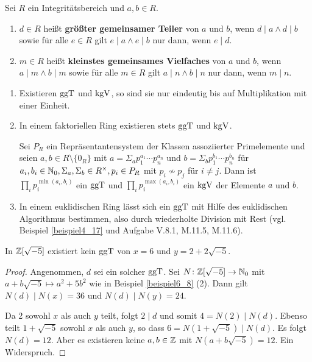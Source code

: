 \begin{definition}\label{definition6_15}
	Sei $R$ ein Integritätsbereich und $a,b \in R$.
	\begin{enumerate}[label=(\alph*)]
		\item $d \in R$ heißt \textbf{größter gemeinsamer Teiler} von $a$ und $b$, wenn $d \mid a \land d \mid b$ sowie für alle $e \in R$ gilt $e \mid a \land e \mid b$ nur dann, wenn $e \mid d$.
		\item $m \in R$ heißt  \textbf{kleinstes gemeinsames Vielfaches} von $a$ und $b$, wenn $a \mid m \land b \mid m$ sowie für alle $m \in R$ gilt $a \mid n \land b \mid n$ nur dann, wenn $m \mid n$.
	\end{enumerate}
\end{definition}
\begin{rem}\label{rem6_16}
	\begin{enumerate}[label=(\roman*)]
		\item Existieren $\mathrm{ggT}$ und $\mathrm{kgV}$, so sind sie nur eindeutig bis auf Multiplikation mit einer Einheit.
		\item In einem faktoriellen Ring existieren stets $\mathrm{ggT}$ und $\mathrm{kgV}$. 
		
		Sei $P_R$ ein Repräsentantensystem der Klassen assoziierter Primelemente und seien $a,b \in R\setminus\{0_R\}$ mit $a = \Sigma_a p_1^{a_1} \cdots p_n^{a_n}$ und $b = \Sigma_b p_1^{b_1} \cdots p_n^{b_n}$ für $a_i,b_i \in \mathbb{N}_0, \Sigma_a, \Sigma_b \in R^\times, p_i \in P_R$ mit $p_i \not\sim p_j$ für $i \neq j$. Dann ist $\prod_i p_i^{\min(a_i,b_i)}$ ein $\mathrm{ggT}$ und $\prod_i p_i^{\max(a_i,b_i)}$ ein $\mathrm{kgV}$ der Elemente $a$ und $b$.
		\item In einem euklidischen Ring lässt sich ein $\mathrm{ggT}$ mit Hilfe des euklidischen Algorithmus bestimmen, also durch wiederholte Division mit Rest (vgl. Beispiel \ref{beispiel4_17} und Aufgabe V.8.1, M.11.5, M.11.6).
	\end{enumerate}
\end{rem}
\begin{beispiel}\label{beispiel6_17}
	In $\mathbb{Z}[\sqrt{-5}]$ existiert kein $\mathrm{ggT}$ von $x = 6$ und $y = 2 + 2\sqrt{-5}$.
	\begin{proof}
	Angenommen, $d$ sei ein solcher $\mathrm{ggT}$. Sei $N \colon \mathbb{Z}[\sqrt{-5}] \to \mathbb{N}_0$ mit $a + b \sqrt{-5} \mapsto a^2 + 5b^2$ wie in Beispiel \ref{beispiel6_8} (2). Dann gilt $N(d) \mid N(x) = 36$ und $N(d) \mid N(y) = 24$.
	
	Da 2 sowohl $x$ als auch $y$ teilt, folgt $2 \mid d$ und somit $4 = N(2) \mid N(d)$. Ebenso teilt $1 + \sqrt{-5}$ sowohl $x$ als auch $y$, so dass $6 = N(1 + \sqrt{-5}) \mid N(d)$. Es folgt $N(d)= 12$. Aber es existieren keine $a,b \in \mathbb{Z}$ mit $N(a + b\sqrt{-5}) = 12$. Ein Widerspruch.
	\end{proof}
\end{beispiel}
